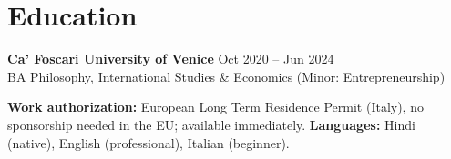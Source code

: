 \documentclass[a4paper,10pt]{article}
\begin{document}
\section{Education}
\textbf{Ca' Foscari University of Venice} \hfill Oct 2020 -- Jun 2024\\
BA Philosophy, International Studies \& Economics (Minor: Entrepreneurship)

\vspace{2pt}
{\small \textbf{Work authorization:} European Long Term Residence Permit (Italy), no sponsorship needed in the EU; available immediately. \quad \textbf{Languages:} Hindi (native), English (professional), Italian (beginner).}
\end{document}

